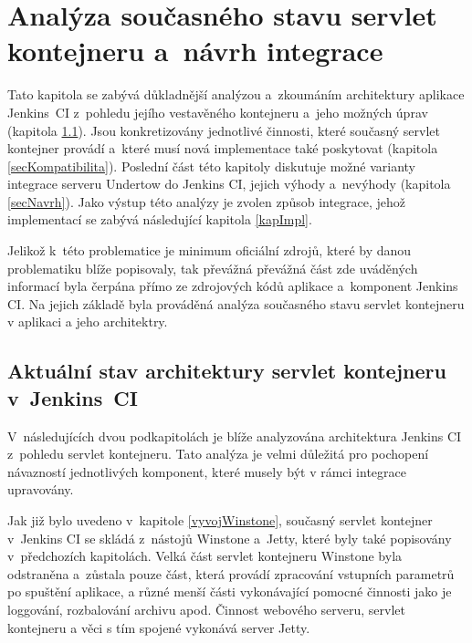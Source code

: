 \chapter{Analýza současného stavu servlet kontejneru a~návrh integrace}
    Tato kapitola se zabývá důkladnější analýzou a~zkoumáním architektury aplikace Jenkins~CI
    z~pohledu jejího vestavěného kontejneru a~jeho možných úprav (kapitola \ref{secArchitecture}). 
    Jsou konkretizovány jednotlivé činnosti, které současný servlet kontejner provádí
    a~které musí nová implementace také poskytovat (kapitola \ref{secKompatibilita}).
    Poslední část této kapitoly diskutuje možné varianty integrace serveru Undertow do Jenkins CI,
    jejich výhody a~nevýhody (kapitola \ref{secNavrh}). Jako výstup této analýzy je zvolen způsob integrace, jehož
    implementací se zabývá následující kapitola \ref{kapImpl}.

    Jelikož k~této problematice je minimum oficiální zdrojů, které by danou problematiku blíže popisovaly, 
    tak převážná převážná část zde uváděných informací byla čerpána přímo ze zdrojových kódů aplikace a~komponent Jenkins CI.
    Na jejich základě byla prováděná analýza současného stavu servlet kontejneru v aplikaci a jeho architektry.
    
    \section{Aktuální stav architektury servlet kontejneru v~Jenkins~CI}\label{secArchitecture}
        V~následujících dvou podkapitolách je blíže analyzována architektura
        Jenkins CI z~pohledu servlet kontejneru. Tato analýza je velmi důležitá
        pro pochopení návazností jednotlivých komponent, které musely být v rámci integrace upravovány.

        Jak již bylo uvedeno v~kapitole \ref{vyvojWinstone}, současný servlet kontejner 
        v~Jenkins CI se skládá z~nástojů Winstone a~Jetty, které byly také popisovány
        v~předchozích kapitolách. Velká část servlet
        kontejneru Winstone byla odstraněna a~zůstala pouze část, která
        provádí zpracování vstupních parametrů po spuštění aplikace, a různé menší části
        vykonávající pomocné činnosti jako je loggování, rozbalování archivu apod. Činnost webového serveru, servlet kontejneru
        a věci s tím spojené vykonává server Jetty.
        

